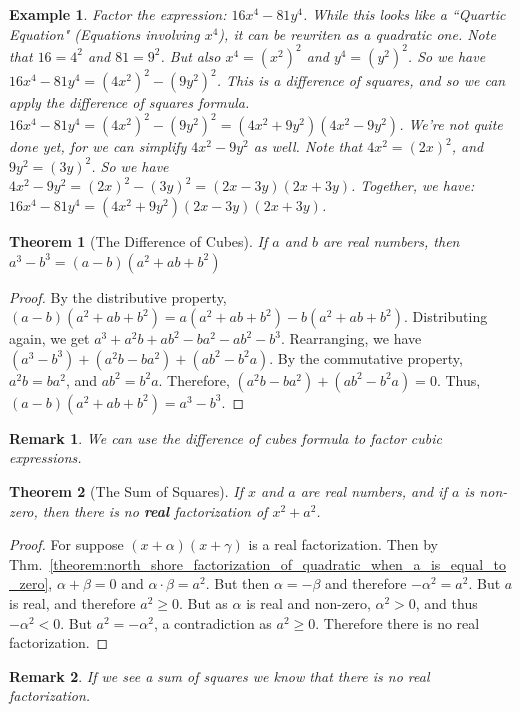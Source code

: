 \documentclass[oneside]{book}
\theoremstyle{mystyle}
\newtheorem{theorem}{Theorem}[section]
\newtheorem{example}{Example}[section]
\newtheorem{remark}{Remark}[section]
\begin{document}
\begin{example}
Factor the expression: $16x^4 - 81y^4$. While this looks like a ``Quartic Equation" (Equations involving $x^4$), it can be rewriten as a quadratic one. Note that $16 = 4^2$ and $81 = 9^2$. But also $x^4 = (x^2)^2$ and $y^4 = (y^2)^2$. So we have $16x^4-81y^4 = (4x^2)^2 - (9y^2)^2$. This is a difference of squares, and so we can apply the difference of squares formula. $16x^4 - 81y^4 = (4x^2)^2 - (9y^2)^2 = (4x^2 + 9y^2)(4x^2 - 9y^2)$. We're not quite done yet, for we can simplify $4x^2 - 9y^2$ as well. Note that $4x^2 = (2x)^2$, and $9y^2 = (3y)^2$. So we have $4x^2 - 9y^2 = (2x)^2 - (3y)^2 = (2x-3y)(2x+3y)$. Together, we have: $16x^4 - 81y^4 = (4x^2 + 9y^2)(2x-3y)(2x+3y)$.
\end{example}
\begin{theorem}[The Difference of Cubes]
\label{theorem:north_shore_difference_of_cubes}
If $a$ and $b$ are real numbers, then $a^{3}-b^{3}=(a-b)(a^{2}+ab+b^{2})$
\end{theorem}
\begin{proof}
By the distributive property, $(a-b)(a^2+ab+b^2) = a(a^2+ab+b^2) - b(a^2+ab+b^2)$. Distributing again, we get $a^3 + a^2b + ab^2 - ba^2 - ab^2 - b^3$. Rearranging, we have $(a^3 - b^3) + (a^2b - ba^2) + (ab^2 - b^2a)$. By the commutative property, $a^2b = ba^2$, and $ab^2 = b^2a$. Therefore, $(a^2b - ba^2)+(ab^2 - b^2a) = 0$. Thus, $(a-b)(a^2+ab+b^2) = a^3 - b^3$.
\end{proof}
\begin{remark}
We can use the difference of cubes formula to factor cubic expressions.
\end{remark}
\begin{theorem}[The Sum of Squares]
\label{theorem:north_shore_sum_of_squares}
If $x$ and $a$ are real numbers, and if $a$ is non-zero, then there is no \textbf{real} factorization of $x^2+a^2$.
\end{theorem}
\begin{proof}
For suppose $(x+\alpha)(x+\gamma)$ is a real factorization. Then by Thm.~\ref{theorem:north_shore_factorization_of_quadratic_when_a_is_equal_to_zero}, $\alpha+\beta = 0$ and $\alpha\cdot \beta = a^2$. But then $\alpha = -\beta$ and therefore $-\alpha^2 = a^2$. But $a$ is real, and therefore $a^2 \geq 0$. But as $\alpha$ is real and non-zero, $\alpha^2> 0$, and thus $-\alpha^2 <0$. But $a^2 = -\alpha^2$, a contradiction as $a^2 \geq 0$. Therefore there is no real factorization.
\end{proof}
\begin{remark}
If we see a sum of squares we know that there is no real factorization.
\end{remark}
\end{document}
